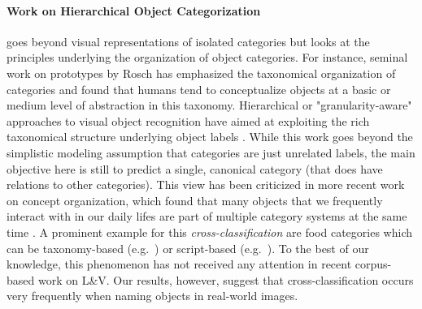 \paragraph{Work on Hierarchical Object Categorization} goes beyond visual representations of isolated categories but looks at the principles underlying the organization of object categories. 
For instance, seminal work on prototypes by Rosch \cite{rosch1976basic} has emphasized the taxonomical organization of categories and found that humans tend to conceptualize objects at a basic or medium level of abstraction in this taxonomy. 
Hierarchical or "granularity-aware" approaches to visual object recognition have aimed at exploiting the rich taxonomical structure underlying object labels \cite{Deng:2012,frome2013,deng2014large,wang2014poodle,peterson2018learning}. 
While this work goes beyond the simplistic modeling assumption that categories are just unrelated labels, the main objective here is still to predict a single, canonical category (that does have relations to other categories). 
This view has been criticized in more recent work on concept organization, which found that many objects that we frequently interact with in our daily lifes are part of multiple category systems at the same time \cite{ross1999food,SHAFTO20111}. A prominent example for this \textit{cross-classification} are food categories which can be taxonomy-based (e.g.\  ) or script-based (e.g.\  ).
To the best of our knowledge, this phenomenon has not received any attention in recent corpus-based work on L\&V.
Our results, however, suggest that cross-classification occurs very frequently when naming objects in real-world images.
 


